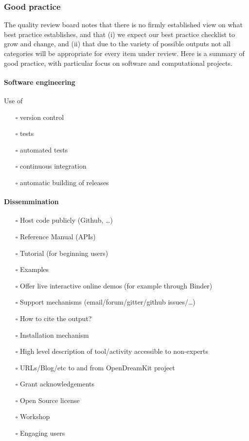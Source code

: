 \subsubsection{Good practice}

The quality review board notes that there is no firmly established
view on what best practice establishes, and that (i) we expect our
best practice checklist to grow and change, and (ii) that due to the
variety of possible outputs not all categories will be appropriate for
every item under review. Here is a summary of good practice, with
particular focus on software and computational projects.

\paragraph{Software engineering}
\label{sec:org2e9824e}

Use of
\begin{itemize}
\item[{$\square$}] version control
\item[{$\square$}] tests
\item[{$\square$}] automated tests
\item[{$\square$}] continuous integration
\item[{$\square$}] automatic building of releases
\end{itemize}

\paragraph{Dissemmination}
\label{sec:org1f65c9b}
\begin{itemize}
\item[{$\square$}] Host code publicly (Github, \ldots{})
\item[{$\square$}] Reference Manual (APIs)
\item[{$\square$}] Tutorial (for beginning users)
\item[{$\square$}] Examples
\item[{$\square$}] Offer live interactive online demos (for example
  through Binder)
\item[{$\square$}] Support mechanisms (email/forum/gitter/github issues/\ldots{})
\item[{$\square$}] How to cite the output?
\item[{$\square$}] Installation mechanism
\item[{$\square$}] High level description of tool/activity accessible to non-experts
\item[{$\square$}] URLs/Blog/etc to and from  OpenDreamKit project
\item[{$\square$}] Grant acknowledgements
\item[{$\square$}] Open Source license
\item[{$\square$}] Workshop
\item[{$\square$}] Engaging users
\end{itemize}

